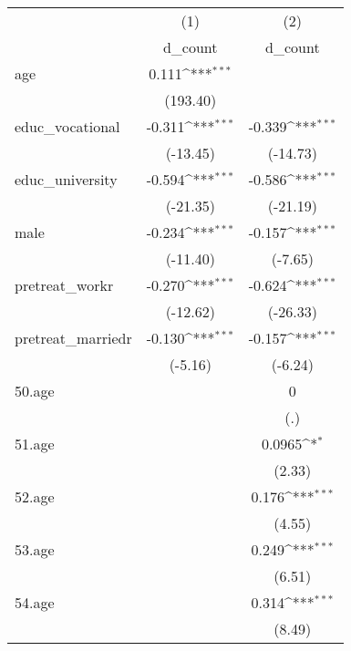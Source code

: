 {
\def\sym#1{\ifmmode^{#1}\else\(^{#1}\)\fi}
\begin{tabular}{l*{2}{c}}
\hline\hline
            &\multicolumn{1}{c}{(1)}&\multicolumn{1}{c}{(2)}\\
            &\multicolumn{1}{c}{d\_count}&\multicolumn{1}{c}{d\_count}\\
\hline
age         &       0.111\sym{***}&                     \\
            &    (193.40)         &                     \\
[1em]
educ\_vocational&      -0.311\sym{***}&      -0.339\sym{***}\\
            &    (-13.45)         &    (-14.73)         \\
[1em]
educ\_university&      -0.594\sym{***}&      -0.586\sym{***}\\
            &    (-21.35)         &    (-21.19)         \\
[1em]
male        &      -0.234\sym{***}&      -0.157\sym{***}\\
            &    (-11.40)         &     (-7.65)         \\
[1em]
pretreat\_workr&      -0.270\sym{***}&      -0.624\sym{***}\\
            &    (-12.62)         &    (-26.33)         \\
[1em]
pretreat\_marriedr&      -0.130\sym{***}&      -0.157\sym{***}\\
            &     (-5.16)         &     (-6.24)         \\
[1em]
50.age      &                     &           0         \\
            &                     &         (.)         \\
[1em]
51.age      &                     &      0.0965\sym{*}  \\
            &                     &      (2.33)         \\
[1em]
52.age      &                     &       0.176\sym{***}\\
            &                     &      (4.55)         \\
[1em]
53.age      &                     &       0.249\sym{***}\\
            &                     &      (6.51)         \\
[1em]
54.age      &                     &       0.314\sym{***}\\
            &                     &      (8.49)         \\

\end{tabular}}
